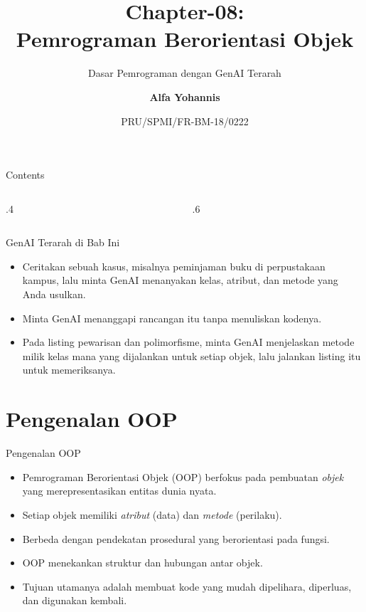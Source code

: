 \documentclass[aspectratio=169, table]{beamer}
\subtitle{Dasar Pemrograman dengan GenAI Terarah}
\title{Chapter-08:\\\LARGE{Pemrograman Berorientasi Objek\\}
\vspace{10pt}}
\date[Serial]{\scriptsize {PRU/SPMI/FR-BM-18/0222}}
\author[Pradita]{\small{\textbf{Alfa Yohannis}}}
\begin{document}
\frame{\titlepage}

\begin{frame}[fragile]{Contents}
\vspace{15pt}
\begin{columns}[t]
\begin{column}{.4\textwidth}
\tableofcontents[sections={1-4}]
\end{column}
\begin{column}{.6\textwidth}
\tableofcontents[sections={5-9}]
\end{column}
\end{columns}
\end{frame}


\begin{frame}{GenAI Terarah di Bab Ini}
\small
\begin{itemize}
  \item Ceritakan sebuah kasus, misalnya peminjaman buku di perpustakaan kampus, lalu minta GenAI menanyakan kelas, atribut, dan metode yang Anda usulkan.
  \item Minta GenAI menanggapi rancangan itu tanpa menuliskan kodenya.
  \item Pada listing pewarisan dan polimorfisme, minta GenAI menjelaskan metode milik kelas mana yang dijalankan untuk setiap objek, lalu jalankan listing itu untuk memeriksanya.
\end{itemize}
\end{frame}

\section{Pengenalan OOP}

\begin{frame}[fragile]{Pengenalan OOP}
\vspace{20pt}
\begin{itemize}
    \item Pemrograman Berorientasi Objek (OOP) berfokus pada pembuatan \emph{objek} yang merepresentasikan entitas dunia nyata.
    \item Setiap objek memiliki \emph{atribut} (data) dan \emph{metode} (perilaku).
    \item Berbeda dengan pendekatan prosedural yang berorientasi pada fungsi.
    \item OOP menekankan struktur dan hubungan antar objek.
    \item Tujuan utamanya adalah membuat kode yang mudah dipelihara, diperluas, dan digunakan kembali.
\end{itemize}
\end{frame}
\end{document}
